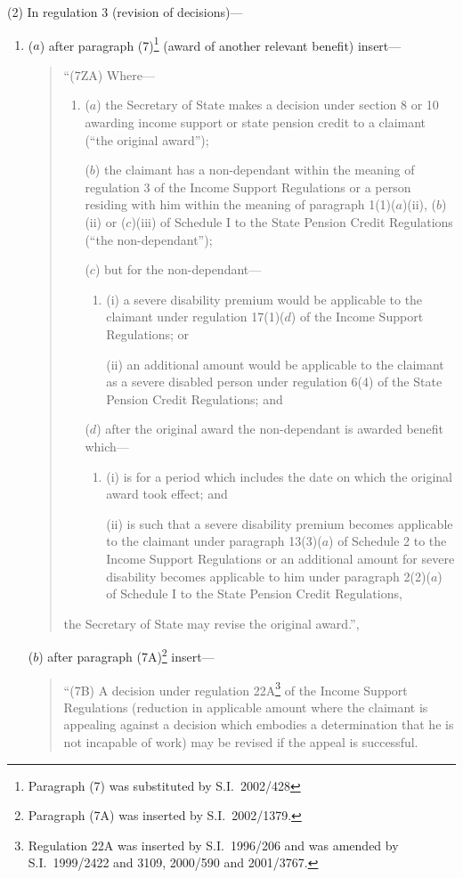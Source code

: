 \documentclass[12pt,a4paper]{article}
\begin{document}
(2) In regulation 3 (revision of decisions)—
\begin{enumerate}\item[]
($a$) after paragraph (7)\footnote{Paragraph (7) was substituted by S.I.\ 2002/428} (award of another relevant benefit) insert—
\begin{quotation}
“(7ZA) Where—
\begin{enumerate}\item[]
($a$) the Secretary of State makes a decision under section 8 or 10 awarding income support or state pension credit to a claimant (“the original award”);

($b$) the claimant has a non-dependant within the meaning of regulation 3 of the Income Support Regulations or a person residing with him within the meaning of paragraph 1(1)($a$)(ii), ($b$)(ii)  or ($c$)(iii)  of Schedule I to the State Pension Credit Regulations (“the non-dependant”);

($c$) but for the non-dependant—
\begin{enumerate}\item[]
(i) a severe disability premium would be applicable to the claimant under regulation 17(1)($d$)  of the Income Support Regulations; or

(ii)  an additional amount would be applicable to the claimant as a severe disabled person under regulation 6(4) of the State Pension Credit Regulations; and
\end{enumerate}

($d$) after the original award the non-dependant is awarded benefit which—
\begin{enumerate}\item[]
(i) is for a period which includes the date on which the original award took effect; and

(ii)  is such that a severe disability premium becomes applicable to the claimant under paragraph 13(3)($a$)  of Schedule 2 to the Income Support Regulations or an additional amount for severe disability becomes applicable to him under paragraph 2(2)($a$)  of Schedule I to the State Pension Credit Regulations,
\end{enumerate}
\end{enumerate}
the Secretary of State may revise the original award.”,
\end{quotation}

($b$) after paragraph (7A)\footnote{Paragraph (7A) was inserted by S.I.\ 2002/1379.} insert—
\begin{quotation}
“(7B) A decision under regulation 22A\footnote{Regulation 22A was inserted by S.I.\ 1996/206 and was amended by S.I.\ 1999/2422 and 3109, 2000/590 and 2001/3767.} of the Income Support Regulations (reduction in applicable amount where the claimant is appealing against a decision which embodies a determination that he is not incapable of work) may be revised if the appeal is successful.


\end{quotation}
\end{enumerate}
\end{document}
